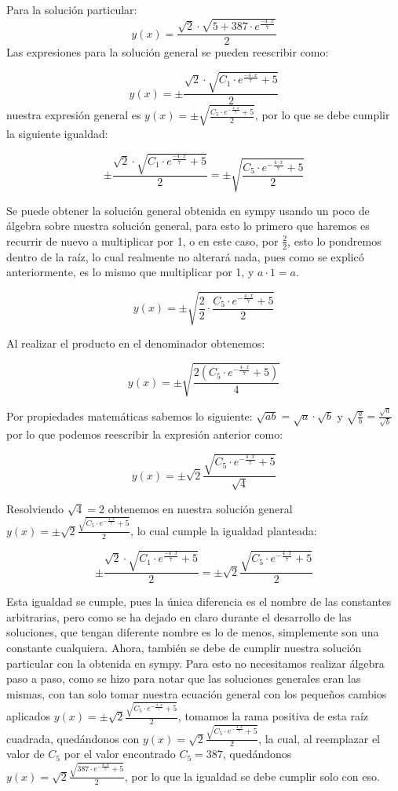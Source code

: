 \documentclass{article}
\begin{document}
Para la solución particular:
\[
 y(x)=\frac{\sqrt{2}\cdot\sqrt{5+387\cdot e^{\frac{-4\cdot x}{7}}}}{2}
\]
Las expresiones para la solución general se pueden reescribir como:

\[
 y(x)=\pm\frac{\sqrt{2}\cdot\sqrt{C_1\cdot e^{\frac{-4\cdot x}{7}}+5}}{2} 
\]
nuestra expresión general es \(y(x) =\pm\sqrt{\frac{C_5\cdot e^{-\frac{4\cdot x}{7}}+5}{2}}\), por lo que se debe cumplir la siguiente igualdad:

\[
 \pm\frac{\sqrt{2}\cdot\sqrt{C_1\cdot e^{\frac{-4\cdot x}{7}}+5}}{2}=\pm\sqrt{\frac{C_5\cdot e^{-\frac{4\cdot x}{7}}+5}{2}}
\]

Se puede obtener la solución general obtenida en sympy usando un poco de álgebra sobre nuestra solución general, para esto lo primero que haremos es recurrir de nuevo a multiplicar por 1, o en este caso, por \(\frac{2}{2}\), esto lo pondremos dentro de la raíz, lo cual realmente no alterará nada, pues como se explicó anteriormente, es lo mismo que multiplicar por 1, y \(a\cdot1=a\).

\[
 y(x) =\pm\sqrt{\frac{2}{2}\cdot\frac{C_5\cdot e^{-\frac{4\cdot x}{7}}+5}{2}}
\]

Al realizar el producto en el denominador obtenemos:

\[
 y(x) =\pm\sqrt{\frac{2(C_5\cdot e^{-\frac{4\cdot x}{7}}+5)}{4}}
\]

Por propiedades matemáticas sabemos lo siguiente: \(\sqrt{ab}=\sqrt{a}\cdot\sqrt{b}\) y \(\sqrt{\frac{a}{b}}=\frac{\sqrt{a}}{\sqrt{b}}\) por lo que podemos reescribir la expresión anterior como:

\[
 y(x) =\pm\sqrt{2}\frac{\sqrt{C_5\cdot e^{-\frac{4\cdot x}{7}}+5}}{\sqrt{4}}
\]

Resolviendo \(\sqrt{4}=2\) obtenemos en nuestra solución general \(y(x) =\pm\sqrt{2}\frac{\sqrt{C_5\cdot e^{-\frac{4\cdot x}{7}}+5}}{2}\), lo cual cumple la igualdad planteada:

\[
 \pm\frac{\sqrt{2}\cdot\sqrt{C_1\cdot e^{\frac{-4\cdot x}{7}}+5}}{2}=\pm\sqrt{2}\frac{\sqrt{C_5\cdot e^{-\frac{4\cdot x}{7}}+5}}{2}
\]

Esta igualdad se cumple, pues la única diferencia es el nombre de las constantes arbitrarias, pero como se ha dejado en claro durante el desarrollo de las soluciones, que tengan diferente nombre es lo de menos, simplemente son una constante cualquiera.
Ahora, también se debe de cumplir nuestra solución particular con la obtenida en sympy. Para esto no necesitamos realizar álgebra paso a paso, como se hizo para notar que las soluciones generales eran las mismas, con tan solo tomar nuestra ecuación general con los pequeños cambios aplicados \(y(x)=\pm\sqrt{2}\frac{\sqrt{C_5\cdot e^{-\frac{4\cdot x}{7}}+5}}{2}\), tomamos la rama positiva de esta raíz cuadrada, quedándonos con \(y(x)=\sqrt{2}\frac{\sqrt{C_5\cdot e^{-\frac{4\cdot x}{7}}+5}}{2}\), la cual, al reemplazar el valor de \(C_5\) por el valor encontrado \(C_5=387\), quedándonos \(y(x)=\sqrt{2}\frac{\sqrt{387\cdot e^{-\frac{4\cdot x}{7}}+5}}{2}\), por lo que la igualdad se debe cumplir solo con eso.
\end{document}
